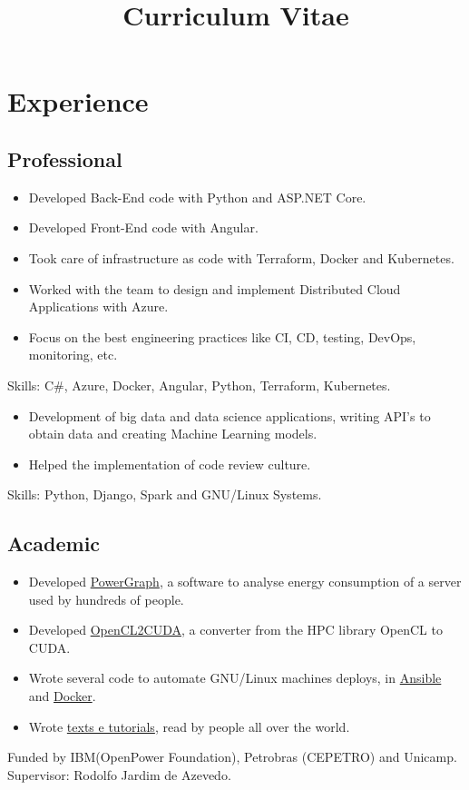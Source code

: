 \documentclass[10pt, a4paper, roman]{moderncv} %
\title{Curriculum Vitae}
\begin{document}
\makecvtitle %

\section{Experience}
\subsection{Professional}

{
    \begin{itemize}
        \item Developed Back-End code with Python and ASP.NET Core. 
        \item Developed Front-End code with Angular.
	    \item Took care of infrastructure as code with Terraform, Docker and Kubernetes.
	    \item Worked with the team to design and implement Distributed Cloud Applications with Azure.
	    \item Focus on the best engineering practices like CI, CD, testing, DevOps, monitoring, etc.
    \end{itemize}
Skills: C\#, Azure, Docker, Angular, Python, Terraform, Kubernetes.
}

{
    \begin{itemize}
        \item Development of big data and data science applications, writing API's to obtain data and creating Machine Learning models. 
        \item Helped the implementation of code review culture.
    \end{itemize}
    Skills: Python, Django, Spark and GNU/Linux Systems.
}

\subsection{Academic}
{
    \begin{itemize}
        \item Developed \href{https://github.com/Guilhermeslucas/powergraph}{PowerGraph}, a software to analyse energy consumption of a server used by hundreds of people.
        \item Developed \href{https://github.com/Guilhermeslucas/OpenCL2CUDA}{OpenCL2CUDA}, a converter from the HPC library OpenCL to CUDA.
        \item Wrote several code to automate GNU/Linux machines deploys, in \href{https://github.com/Guilhermeslucas/Ansible-Code}{Ansible} and 
            \href{https://github.com/Guilhermeslucas/Dockerfiles}{Docker}.
        \item Wrote \href{http://openpower.ic.unicamp.br/blog/}{texts e tutorials}, read by people all over the world. 
    \end{itemize}
    Funded by IBM(OpenPower Foundation), Petrobras (CEPETRO) and Unicamp.\\
    Supervisor: Rodolfo Jardim de Azevedo.
}
\end{document}
